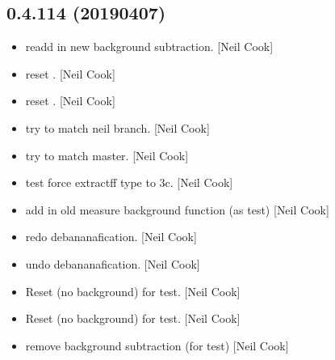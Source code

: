 \documentclass[a4paper,10pt,english]{report}
\begin{document}
\subsection{0.4.114 (2019\sphinxhyphen{}04\sphinxhyphen{}07)}
\label{\detokenize{misc/changelog:id165}}\begin{itemize}
\item {} 
 \sphinxhyphen{} re\sphinxhyphen{}add in new background subtraction. {[}Neil
Cook{]}

\item {} 
 \sphinxhyphen{} reset . {[}Neil Cook{]}

\item {} 
 \sphinxhyphen{} reset . {[}Neil Cook{]}

\item {} 
 \sphinxhyphen{} try to match neil branch. {[}Neil Cook{]}

\item {} 
 \sphinxhyphen{} try to match master. {[}Neil Cook{]}

\item {} 
 \sphinxhyphen{} test force extractff type to 3c. {[}Neil Cook{]}

\item {} 
 \sphinxhyphen{} add in old measure background function (as test) {[}Neil
Cook{]}

\item {} 
 \sphinxhyphen{} redo debananafication. {[}Neil Cook{]}

\item {} 
 \sphinxhyphen{} undo debananafication. {[}Neil Cook{]}

\item {} 
Reset  (no background) for test. {[}Neil Cook{]}

\item {} 
Reset  (no background) for test. {[}Neil Cook{]}

\item {} 
 \sphinxhyphen{} remove background subtraction (for test) {[}Neil
Cook{]}

\end{itemize}
\end{document}
